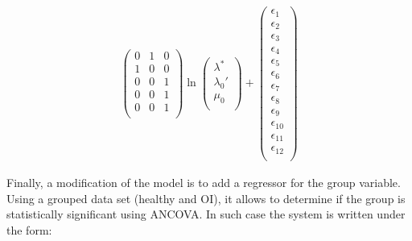 \documentclass[a4paper,fleqn]{DC_ArtStyle}
\begin{document}
\begin{equation}
\begin{split}
\begin{pmatrix}
			0 & 1 & 0 \\
			1 & 0 & 0 \\
			0 & 0 & 1 \\
			0 & 0 & 1 \\
			0 & 0 & 1 \\
		\end{pmatrix} \ln\begin{pmatrix}
			\lambda^{*} \\
			\lambda_0' \\
			\mu_0 \\
		\end{pmatrix} + \begin{pmatrix}
			\epsilon_{1} \\
			\epsilon_{2} \\
			\epsilon_{3} \\
			\epsilon_{4} \\
			\epsilon_{5} \\
			\epsilon_{6} \\
			\epsilon_{7} \\
			\epsilon_{8} \\
			\epsilon_{9} \\
			\epsilon_{10} \\
			\epsilon_{11} \\
			\epsilon_{12} \\
		\end{pmatrix}
	\end{split}
\end{equation}

Finally, a modification of the model is to add a regressor for the group variable. Using a grouped data set (healthy and OI), it allows to determine if the group is statistically significant using ANCOVA. In such case the system is written under the form:
\end{document}
